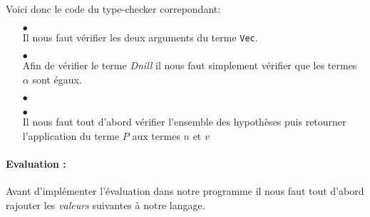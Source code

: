 \documentclass {article}
\newcommand{\codefrom}[3]
           {}
\theoremstyle{definition}
\theoremstyle{remark}
\newcommand{\fun}[1]{\lstinline!#1!}
\begin{document}
Voici donc le code du type-checker correpondant:
\begin{itemize}
   
\item[$\bullet$] \\
  
  Il nous faut vérifier les deux arguments du terme \fun{Vec}.
  \codefrom{dependent}{lambda}{check_vec}

  
\item[$\bullet$] \\
  Afin de vérifier le terme \emph{Dnill} il nous faut simplement vérifier que les termes $\alpha$
  sont égaux.
  \codefrom{dependent}{lambda}{check_dnil}

\item[$\bullet$] \\
  \codefrom{dependent}{lambda}{check_dcons}


\item[$\bullet$] \\
  Il nous faut tout d'abord vérifier l'ensemble des hypothèses puis retourner l'application du terme $P$
  aux termes $n$ et $v$ 
  \codefrom{dependent}{lambda}{synth_dfold}

    
\end{itemize} 




\paragraph{Evaluation :} 
Avant d'implémenter l'évaluation dans notre programme il nous faut tout d'abord
rajouter les \emph{valeurs} suivantes à notre langage.
\codefrom{dependent}{lambda}{Value_Vector}
\end{document}
